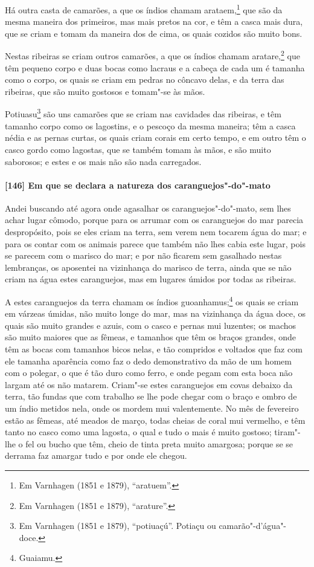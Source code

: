 \begin{linenumbers}
Há outra casta de camarões, a que os índios chamam arataem,\footnote{ Em Varnhagen (1851 e
1879), ``aratuem''.} que são da mesma maneira dos primeiros, mas mais pretos na cor, e
têm a casca mais dura, que se criam e tomam da maneira dos de cima, os quais cozidos são
muito bons.

Nestas ribeiras se criam outros camarões, a que os índios chamam aratare,\footnote{ Em
Varnhagen (1851 e 1879), ``arature''.} que têm pequeno corpo e duas bocas como lacraus e
a cabeça de cada um é tamanha como o corpo, os quais se criam em pedras no côncavo delas,
e da terra das ribeiras, que são muito gostosos e tomam"-se às mãos.

Potiuasu\footnote{ Em Varnhagen (1851 e 1879), ``potiuaçú''. Potiaçu ou
camarão"-d'água"-doce.} são uns camarões que se criam nas cavidades das ribeiras, e têm
tamanho corpo como os lagostins, e o pescoço da mesma maneira; têm a casca nédia e as
pernas curtas, os quais criam corais em certo tempo, e em outro têm o casco gordo como
lagostas, que se também tomam às mãos, e são muito saborosos; e estes e os mais não são
nada carregados.

\paragraph{[146] Em que se declara a natureza dos caranguejos"-do"-mato}\quad
Andei buscando até agora onde agasalhar os caranguejos"-do"-mato, sem lhes achar lugar
cômodo, porque para os arrumar com os caranguejos do mar parecia despropósito, pois se
eles criam na terra, sem verem nem tocarem água do mar; e para os contar com os animais
parece que também não lhes cabia este lugar, pois se parecem com o marisco do mar; e por
não ficarem sem gasalhado nestas lembranças, os aposentei na vizinhança do marisco de
terra, ainda que se não criam na água estes caranguejos, mas em lugares úmidos por todas
as ribeiras.

A estes caranguejos da terra chamam os índios guoanhamus;\footnote{ Guaiamu.} os quais se
criam em várzeas úmidas, não muito longe do mar, mas na vizinhança da água doce, os quais
são muito grandes e azuis, com o casco e pernas mui luzentes; os machos são muito maiores
que as fêmeas, e tamanhos que têm os braços grandes, onde têm as bocas com tamanhos bicos
nelas, e tão compridos e voltados que faz com ele tamanha aparência como faz o dedo
demonstrativo da mão de um homem com o polegar, o que é tão duro como ferro, e onde pegam
com esta boca não largam até os não matarem. Criam"-se estes caranguejos em covas debaixo
da terra, tão fundas que com trabalho se lhe pode chegar com o braço e ombro de um índio
metidos nela, onde os mordem mui valentemente. No mês de fevereiro estão as fêmeas, até
meados de março, todas cheias de coral mui vermelho, e têm tanto no casco como uma
lagosta, o qual e tudo o mais é muito gostoso; tiram"-lhe o fel ou bucho que têm, cheio de
tinta preta muito amargosa; porque se se derrama faz amargar tudo e por onde ele chegou.


\end{linenumbers}
